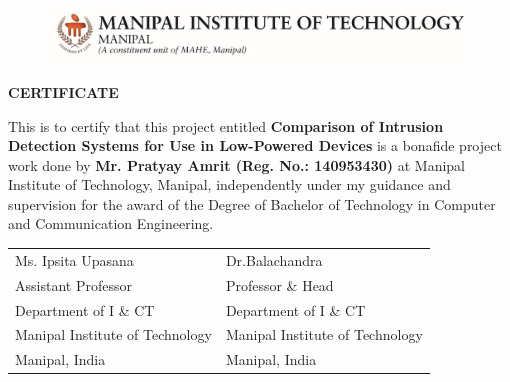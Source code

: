 \begin{figure}[bpht!]
  \begin{center}
	\includegraphics[scale=1]{MITLogo}
	\end{center}
	\end{figure}
\begin{center}
\large{\textbf{CERTIFICATE}}\\
\end{center}


This is to certify that this project entitled \textbf{Comparison of Intrusion Detection Systems for Use in Low-Powered Devices} is a bonafide project work done by \textbf{Mr. Pratyay Amrit (Reg. No.: 140953430)} at Manipal Institute of Technology, Manipal, independently under my guidance and supervision for the award of the Degree of
Bachelor of Technology in Computer and Communication Engineering.


\vspace{4cm}

\begin{table}[h]
	\centering
		\begin{tabular}{p{3in} p{3in}}
			Ms. Ipsita Upasana &  Dr.Balachandra  \\
			Assistant Professor & Professor \& Head \\
			  Department of I \& CT&  Department of I \& CT \\
			Manipal Institute of Technology  & Manipal Institute of Technology\\
			Manipal, India &  Manipal, India
		\end{tabular}
\end{table}

